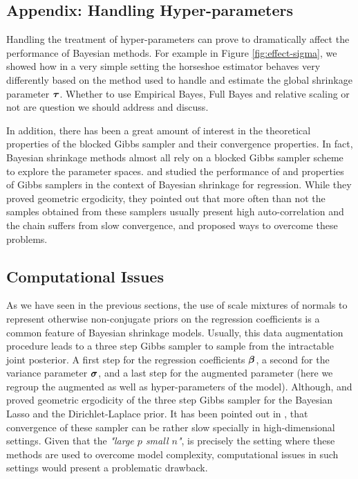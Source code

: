 \documentclass[ba]{imsart}
\begin{document}
\begin{appendix}
\section{Appendix: Handling Hyper-parameters}\label{sec:hyper}

Handling the treatment of hyper-parameters can prove to dramatically affect the performance of Bayesian  methods. For example in Figure \ref{fig:effect-sigma}, we showed how in a very simple setting the horseshoe estimator behaves very differently based on the method used to handle and estimate the global shrinkage parameter $\boldsymbol{\tau}$. Whether to use Empirical Bayes, Full Bayes and relative scaling or not are question we should address and discuss.

In addition, there has been a great amount of interest in the theoretical properties of the blocked Gibbs sampler and their convergence properties. In fact, Bayesian shrinkage methods almost all rely on a blocked Gibbs sampler scheme to explore the parameter spaces. \cite{Rajaratnam2017Gibbs} and \cite{Khare2014ergodicity} studied the performance of and properties of Gibbs samplers in the context   of Bayesian shrinkage for regression. While they proved geometric ergodicity, they  pointed out that more often than not the samples obtained from these samplers usually present high auto-correlation and the chain suffers from slow convergence, and proposed   ways to overcome these problems.

\subsection{Computational Issues}

As we have seen in the previous sections, the use of scale mixtures of normals to represent otherwise non-conjugate priors on the regression coefficients is a common feature of Bayesian shrinkage models. Usually, this data augmentation procedure leads to a three step Gibbs sampler to sample from the intractable joint posterior. A first step for the regression coefficients $\boldsymbol{\beta}$, a second for the variance parameter $\boldsymbol{\sigma}$, and a last step for the augmented parameter (here we regroup the augmented as well as hyper-parameters of the model). Although, \cite{Khare2013blasso_ergodicity} and \cite{Khare2014ergodicity} proved geometric ergodicity of the three step Gibbs sampler for the Bayesian Lasso and the Dirichlet-Laplace prior. It has been pointed out in \cite{Rajaratnam2017Gibbs}, that convergence of these sampler can be rather slow specially in high-dimensional settings. Given that the \textit{"large $p$ small $n$"}, is precisely the setting where these methods are used to overcome model complexity, computational issues in such settings would present a problematic drawback. 


\end{appendix}
\end{document}
